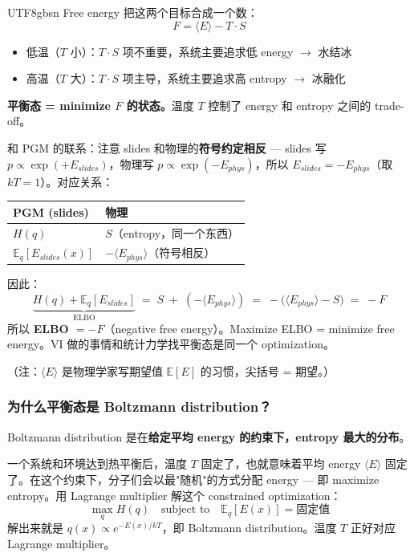 \documentclass[11pt]{article}
\begin{document}
\begin{CJK}{UTF8}{gbsn}
Free energy 把这两个目标合成一个数：
\[
  F = \langle E \rangle - T \cdot S
\]

\begin{itemize}
  \item 低温（$T$ 小）：$T \cdot S$ 项不重要，系统主要追求低 energy $\to$ 水结冰
  \item 高温（$T$ 大）：$T \cdot S$ 项主导，系统主要追求高 entropy $\to$ 冰融化
\end{itemize}

\textbf{平衡态 = minimize $F$ 的状态。}温度 $T$ 控制了 energy 和 entropy 之间的 trade-off。

和 PGM 的联系：注意 slides 和物理的\textbf{符号约定相反} --- slides 写 $p \propto \exp(+E_{slides})$，物理写 $p \propto \exp(-E_{phys})$，所以 $E_{slides} = -E_{phys}$（取 $kT=1$）。对应关系：

\begin{center}
\begin{tabular}{l|l}
  \textbf{PGM (slides)} & \textbf{物理} \\
  \hline
  $H(q)$ & $S$（entropy，同一个东西） \\
  $\mathbb{E}_q[E_{slides}(x)]$ & $-\langle E_{phys}\rangle$（符号相反） \\
\end{tabular}
\end{center}

因此：
\[
  \underbrace{H(q) + \mathbb{E}_q[E_{slides}]}_{\text{ELBO}}
  \;=\; S \;+\; (-\langle E_{phys}\rangle)
  \;=\; -\big(\langle E_{phys}\rangle - S\big)
  \;=\; -F
\]
所以 \textbf{ELBO $= -F$}（negative free energy）。Maximize ELBO = minimize free energy。VI 做的事情和统计力学找平衡态是同一个 optimization。

（注：$\langle E \rangle$ 是物理学家写期望值 $\mathbb{E}[E]$ 的习惯，尖括号 = 期望。）

\subsubsection{为什么平衡态是 Boltzmann distribution？}

Boltzmann distribution 是在\textbf{给定平均 energy 的约束下，entropy 最大的分布}。

一个系统和环境达到热平衡后，温度 $T$ 固定了，也就意味着平均 energy $\langle E \rangle$ 固定了。在这个约束下，分子们会以最"随机"的方式分配 energy --- 即 maximize entropy。用 Lagrange multiplier 解这个 constrained optimization：
\[
  \max_q H(q) \quad \text{subject to} \quad \mathbb{E}_q[E(x)] = \text{固定值}
\]
解出来就是 $q(x) \propto e^{-E(x)/kT}$，即 Boltzmann distribution。温度 $T$ 正好对应 Lagrange multiplier。


\end{CJK}
\end{document}
